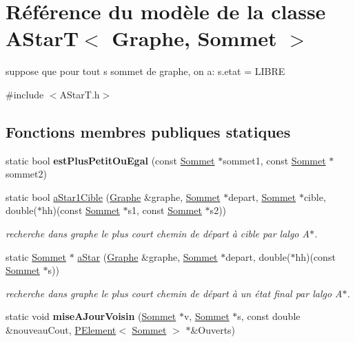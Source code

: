 \hypertarget{class_a_star_t}{}\section{Référence du modèle de la classe A\+StarT$<$ Graphe, Sommet $>$}
\label{class_a_star_t}


suppose que pour tout s sommet de graphe, on a\+: s.\+etat = L\+I\+B\+RE  




{\ttfamily \#include $<$A\+Star\+T.\+h$>$}

\subsection*{Fonctions membres publiques statiques}
\begin{DoxyCompactItemize}
\item 
\mbox{\label{class_a_star_t_a57af36028134b9e3cc2bf347a44fabda}} 
static bool {\bfseries est\+Plus\+Petit\+Ou\+Egal} (const \mbox{\hyperlink{class_sommet}{Sommet}} $\ast$sommet1, const \mbox{\hyperlink{class_sommet}{Sommet}} $\ast$sommet2)
\item 
static bool \mbox{\hyperlink{class_a_star_t_a32cec8b2f83ca9ce7329baaec2dd1a82}{a\+Star1\+Cible}} (\mbox{\hyperlink{class_graphe}{Graphe}} \&graphe, \mbox{\hyperlink{class_sommet}{Sommet}} $\ast$depart, \mbox{\hyperlink{class_sommet}{Sommet}} $\ast$cible, double($\ast$hh)(const \mbox{\hyperlink{class_sommet}{Sommet}} $\ast$s1, const \mbox{\hyperlink{class_sommet}{Sommet}} $\ast$s2))
\begin{DoxyCompactList}\small\item\em recherche dans graphe le plus court chemin de départ à cible par l\textquotesingle{}algo A$\ast$. \end{DoxyCompactList}\item 
static \mbox{\hyperlink{class_sommet}{Sommet}} $\ast$ \mbox{\hyperlink{class_a_star_t_aec39a6d52f7a7941175e246fff59b7f0}{a\+Star}} (\mbox{\hyperlink{class_graphe}{Graphe}} \&graphe, \mbox{\hyperlink{class_sommet}{Sommet}} $\ast$depart, double($\ast$hh)(const \mbox{\hyperlink{class_sommet}{Sommet}} $\ast$s))
\begin{DoxyCompactList}\small\item\em recherche dans graphe le plus court chemin de départ à un état final par l\textquotesingle{}algo A$\ast$. \end{DoxyCompactList}\item 
\mbox{\label{class_a_star_t_aff2a7fd7b3bf9a4974ae34245b0afbef}} 
static void {\bfseries mise\+A\+Jour\+Voisin} (\mbox{\hyperlink{class_sommet}{Sommet}} $\ast$v, \mbox{\hyperlink{class_sommet}{Sommet}} $\ast$s, const double \&nouveau\+Cout, \mbox{\hyperlink{class_p_element}{P\+Element}}$<$ \mbox{\hyperlink{class_sommet}{Sommet}} $>$ $\ast$\&Ouverts)
\end{DoxyCompactItemize}


